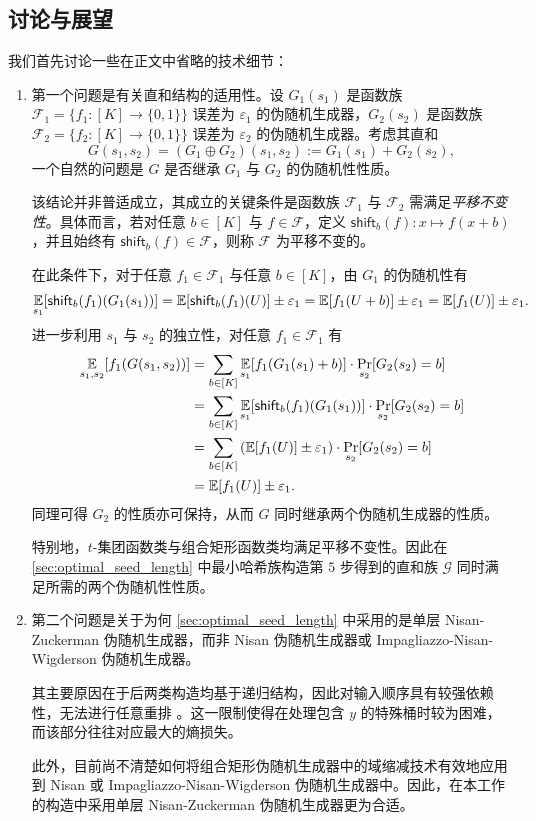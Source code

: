 \subsection{讨论与展望}

我们首先讨论一些在正文中省略的技术细节：
\begin{enumerate}
    \item 第一个问题是有关直和结构的适用性。设 $G_1(s_1)$ 是函数族 $\mathcal{F}_1 = \{f_1 : [K] \to \{0, 1\}\}$ 误差为 $\varepsilon_1$ 的伪随机生成器，$G_2(s_2)$ 是函数族 $\mathcal{F}_2 = \{f_2 : [K] \to \{0, 1\}\}$ 误差为 $\varepsilon_2$ 的伪随机生成器。考虑其直和
    $$
    G(s_1, s_2) = (G_1 \oplus G_2)(s_1, s_2) := G_1(s_1) + G_2(s_2),
    $$
    一个自然的问题是 $G$ 是否继承 $G_1$ 与 $G_2$ 的伪随机性性质。

    该结论并非普适成立，其成立的关键条件是函数族 $\mathcal{F}_1$ 与 $\mathcal{F}_2$ 需满足\emph{平移不变性}。具体而言，若对任意 $b \in [K]$ 与 $f \in \mathcal{F}$，定义 $\mathsf{shift}_b(f) : x \mapsto f(x + b)$，并且始终有 $\mathsf{shift}_b(f) \in \mathcal{F}$，则称 $\mathcal{F}$ 为平移不变的。

    在此条件下，对于任意 $f_1 \in \mathcal{F}_1$ 与任意 $b \in [K]$，由 $G_1$ 的伪随机性有
    $$
    \operatorname*{\mathbb{E}}_{s_1}[\mathsf{shift}_b(f_1)(G_1(s_1))] 
    = \operatorname*{\mathbb{E}}[\mathsf{shift}_b(f_1)(U)] \pm \varepsilon_1
    = \operatorname*{\mathbb{E}}[f_1(U + b)] \pm \varepsilon_1
    = \operatorname*{\mathbb{E}}[f_1(U)] \pm \varepsilon_1.
    $$
    进一步利用 $s_1$ 与 $s_2$ 的独立性，对任意 $f_1 \in \mathcal{F}_1$ 有
    \begin{align*}
        \operatorname*{\mathbb{E}}_{s_1, s_2}[f_1(G(s_1, s_2))] 
        &= \sum_{b \in [K]} \operatorname*{\mathbb{E}}_{s_1}[f_1(G_1(s_1) + b)] \cdot \Pr_{s_2}[G_2(s_2) = b] \\
        &= \sum_{b \in [K]} \operatorname*{\mathbb{E}}_{s_1}[\mathsf{shift}_b(f_1)(G_1(s_1))] \cdot \Pr_{s_2}[G_2(s_2) = b] \\
        &= \sum_{b \in [K]} \left( \operatorname*{\mathbb{E}}[f_1(U)] \pm \varepsilon_1 \right) \cdot \Pr_{s_2}[G_2(s_2) = b] \\
        &= \operatorname*{\mathbb{E}}[f_1(U)] \pm \varepsilon_1.
    \end{align*}
    同理可得 $G_2$ 的性质亦可保持，从而 $G$ 同时继承两个伪随机生成器的性质。

    特别地，$t$-集团函数类与组合矩形函数类均满足平移不变性。因此在 \ref{sec:optimal_seed_length} 中最小哈希族构造第 $5$ 步得到的直和族 $\mathcal{G}$ 同时满足所需的两个伪随机性性质。

    \item 第二个问题是关于为何 \ref{sec:optimal_seed_length} 中采用的是单层 Nisan-Zuckerman 伪随机生成器，而非 Nisan 伪随机生成器或 Impagliazzo-Nisan-Wigderson 伪随机生成器。

    其主要原因在于后两类构造均基于递归结构，因此对输入顺序具有较强依赖性，无法进行任意重排 \cite{tzur2009notions}。这一限制使得在处理包含 $y$ 的特殊桶时较为困难，而该部分往往对应最大的熵损失。

    此外，目前尚不清楚如何将组合矩形伪随机生成器中的域缩减技术有效地应用到 Nisan 或 Impagliazzo-Nisan-Wigderson 伪随机生成器中。因此，在本工作的构造中采用单层 Nisan-Zuckerman 伪随机生成器更为合适。
\end{enumerate}

